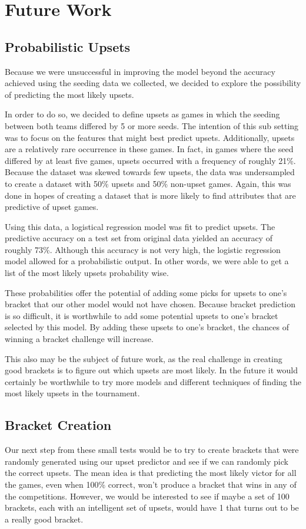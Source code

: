 \section{Future Work}

\subsection{Probabilistic Upsets}

Because we were unsuccessful in improving the model beyond the accuracy achieved using the seeding data we collected, we decided to explore the possibility of predicting the most likely upsets. 

In order to do so, we decided to define upsets as games in which the seeding between both teams differed by 5 or more seeds. 
The intention of this sub setting was to focus on the features that might best predict upsets. 
Additionally, upsets are a relatively rare occurrence in these games. 
In fact, in games where the seed differed by at least five games, upsets occurred with a frequency of roughly 21\%.
Because the dataset was skewed towards few upsets, the data was undersampled to create a dataset with 50\% upsets and 50\% non-upset games. 
Again, this was done in hopes of creating a dataset that is more likely to find attributes that are predictive of upset games. 

Using this data, a logistical regression model was fit to predict upsets. 
The predictive accuracy on a test set from original data yielded an accuracy of roughly 73\%. 
Although this accuracy is not very high, the logistic regression model allowed for a probabilistic output. 
In other words, we were able to get a list of the most likely upsets probability wise. 

These probabilities offer the potential of adding some picks for upsets to one’s bracket that our other model would not have chosen. 
Because bracket prediction is so difficult, it is worthwhile to add some potential upsets to one’s bracket selected by this model. 
By adding these upsets to one’s bracket, the chances of winning a bracket challenge will increase. 

This also may be the subject of future work, as the real challenge in creating good brackets is to figure out which upsets are most likely. 
In the future it would certainly be worthwhile to try more models and different techniques of finding the most likely upsets in the tournament.

\subsection{Bracket Creation}

Our next step from these small tests would be to try to create brackets that were randomly generated using our upset predictor and see if we can randomly pick the correct upsets.
The mean idea is that predicting the most likely victor for all the games, even when 100\% correct, won't produce a bracket that wins in any of the competitions.
However, we would be interested to see if maybe a set of 100 brackets, each with an intelligent set of upsets, would have 1 that turns out to be a really good bracket.
